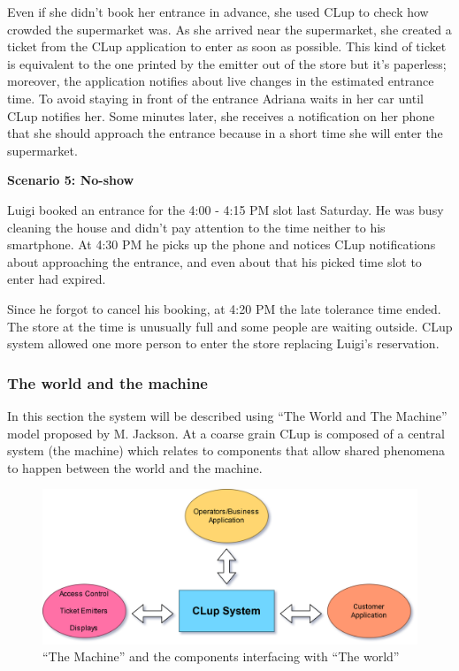 \smallskip

Even if she didn't book her entrance in advance, she used CLup to check how crowded the supermarket was. As she arrived near the supermarket, she created a ticket from the CLup application to enter as soon as possible. This kind of ticket is equivalent to the one printed by the emitter out of the store but it's paperless; moreover, the application notifies about live changes in the estimated entrance time. To avoid staying in front of the entrance Adriana waits in her car until CLup notifies her.
Some minutes later, she receives a notification on her phone that she should approach the entrance because in a short time she will enter the supermarket.

\medskip

\textbf{Scenario 5: No-show}

Luigi booked an entrance for the 4:00 - 4:15 PM slot last Saturday. He was busy cleaning the house and didn't pay attention to the time neither to his smartphone. At 4:30 PM he picks up the phone and notices CLup notifications about approaching the entrance, and even about that his picked time slot to enter had expired.

\smallskip

Since he forgot to cancel his booking, at 4:20 PM the late tolerance time ended. The store at the time is unusually full and some people are waiting outside. CLup system allowed one more person to enter the store replacing Luigi's reservation.

\vfill



\subsubsection{The world and the machine}
In this section the system will be described using ``The World and The Machine'' model proposed by M. Jackson.
At a coarse grain CLup is composed of a central system (the machine) which relates to components that allow shared phenomena to happen between the world and the machine.

\begin{figure}[H]
    \includegraphics[width=\textwidth]{Images/system2.png}
    \caption{\label{fig:Coarse_Grain_System}``The Machine'' and the components interfacing with ``The world''}
\end{figure}

